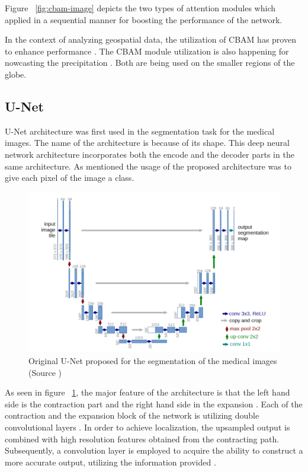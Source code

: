 Figure ~\ref{fig:cbam-image} depicts the two types of attention modules which applied in a sequential manner for boosting the performance of the network\cite{woo2018cbam}.

In the context of analyzing geospatial data, the utilization of CBAM has proven to enhance performance \cite{mao2023reconstructing}.
The CBAM module utilization is also happening for nowcasting the precipitation \cite{trebing2021smaatunet}. Both \cite{mao2023reconstructing} \cite{trebing2021smaatunet} are being used on the smaller regions of the globe.

\subsection{U-Net}

U-Net architecture was first used in the segmentation task for the medical images. The name of the architecture is because of its shape. This deep neural network architecture incorporates both the encode and the decoder parts in the same architecture. As mentioned the usage of the proposed architecture was to give each pixel of the image a class.


\begin{figure}[h]
    \centering
    \includegraphics[width=1.0\linewidth]{figures/chapter-4/unet.png}
    \caption{Original U-Net proposed for the segmentation of the medical images (Source \cite{ronneberger2015unet}) }
    \label{fig:unet}
\end{figure}

As seen in figure ~\ref{fig:unet}, the major feature of the architecture is that the left hand side is the contraction part and the right hand side in the expansion \cite{ronneberger2015unet}. Each of the contraction and the expansion block of the network is utilizing double convolutional layers \cite{ronneberger2015unet}.
In order to achieve localization, the upsampled output is combined with high resolution features obtained from the contracting path. Subsequently, a convolution layer is employed to acquire the ability to construct a more accurate output, utilizing the information provided \cite{ronneberger2015unet}.

